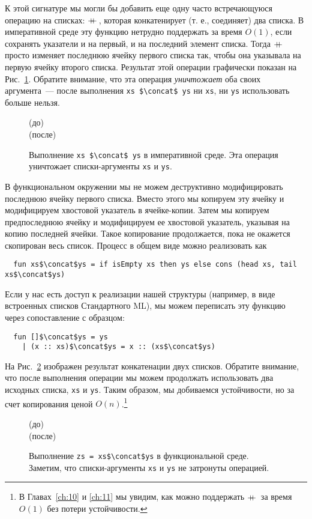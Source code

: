 К этой сигнатуре мы могли бы добавить еще одну часто встречающуюся
операцию на списках: $+\!\!\!+\,$, которая конкатенирует (т. е.,
соединяет) два списка. В императивной среде эту функцию нетрудно
поддержать за время $O(1)$, если сохранять указатели и на первый, и на
последний элемент списка.  Тогда $+\!\!\!+\,$ просто изменяет последнюю
ячейку первого списка так, чтобы она указывала на первую ячейку
второго списка.  Результат этой операции графически показан на
Рис.~\ref{fig:2.4}. Обратите внимание, что эта операция
\emph{уничтожает} оба своих аргумента~--- после выполнения
\lstinline!xs $\concat$ ys! ни \lstinline!xs!, ни \lstinline!ys! использовать
больше нельзя.

\begin{figure}
  \centering
  (до)\\
  (после)\\
  \caption{Выполнение \lstinline!xs $\concat$ ys! в императивной среде. Эта операция уничтожает списки-аргументы \lstinline!xs! и \lstinline!ys!.}
  \label{fig:2.4}
\end{figure}

В функциональном окружении мы не можем деструктивно модифицировать
последнюю ячейку первого списка. Вместо этого мы копируем эту ячейку и
модифицируем хвостовой указатель в ячейке-копии. Затем мы копируем
предпоследнюю ячейку и модифицируем ее хвостовой указатель, указывая
на копию последней ячейки.  Такое копирование продолжается, пока
не окажется скопирован  весь список. Процесс в общем виде можно
реализовать как
\begin{lstlisting}
  fun xs$\concat$ys = if isEmpty xs then ys else cons (head xs, tail xs$\concat$ys)
\end{lstlisting}
Если у нас есть доступ к реализации нашей структуры (например, в виде
встроенных списков Стандартного ML), мы можем переписать эту функцию
через сопоставление с образцом:
\begin{lstlisting}
  fun []$\concat$ys = ys
    | (x :: xs)$\concat$ys = x :: (xs$\concat$ys)
\end{lstlisting}
На Рис.~\ref{fig:2.5} изображен результат конкатенации двух
списков. Обратите внимание, что после выполнения операции мы можем
продолжать использовать два исходных списка, \lstinline!xs! и
\lstinline!ys!. Таким образом, мы добиваемся устойчивости, но за счет
копирования ценой $O(n)$.\footnote{%
  В Главах~\ref{ch:10} и \ref{ch:11} мы увидим, как можно поддержать
  $+\!\!\!+\,$ за время $O(1)$ без потери устойчивости.
}

\begin{figure}
  \centering
  (до)\\
  (после)\\
  \caption{Выполнение \lstinline!zs = xs$\concat$ys! в функциональной среде. Заметим, что списки-аргументы \lstinline!xs! и \lstinline!ys! не затронуты операцией.}
  \label{fig:2.5}
\end{figure}

